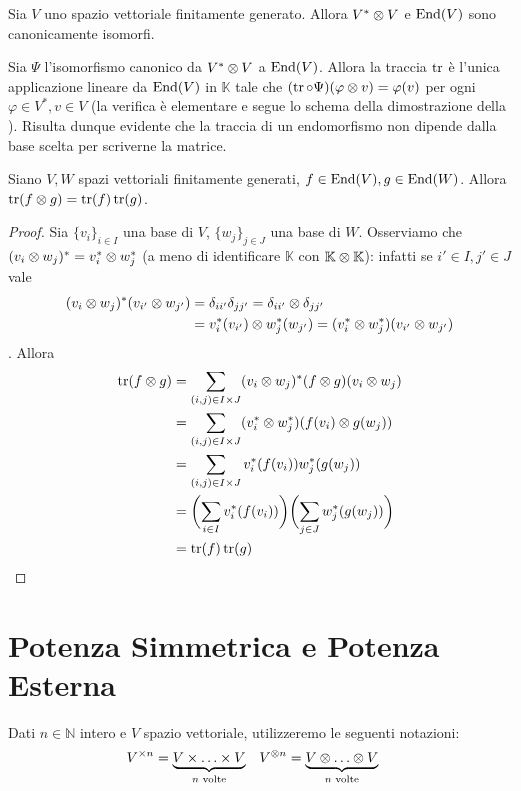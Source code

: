 \begin{corollary}
Sia $V$ uno spazio vettoriale finitamente generato. Allora $V^*\otimes V$ e $\operatorname{End}(V)$ sono canonicamente isomorfi.
\end{corollary}

\begin{example}
Sia $\Psi$ l'isomorfismo canonico da $V^*\otimes V$ a $\operatorname{End}(V)$. Allora la traccia $\operatorname{tr}$ è l'unica applicazione lineare da $\operatorname{End}(V)$ in $\mathbb{K}$ tale che $(\operatorname{tr}\circ\Psi)(\varphi\otimes v)=\varphi(v)$ per ogni $\varphi\in V^*,v\in V$ (la verifica è elementare e segue lo schema della dimostrazione della ). Risulta dunque evidente che la traccia di un endomorfismo non dipende dalla base scelta per scriverne la matrice.
\end{example}

\begin{proposition}
Siano $V\comma W$ spazi vettoriali finitamente generati, $f\in\operatorname{End}(V),\allowbreak g\in\operatorname{End}(W)$. Allora $\operatorname{tr}(f\otimes g)=\operatorname{tr}(f)\operatorname{tr}(g)$.
\end{proposition}
\begin{proof}
Sia $\{v_i\}_{i\in I}$ una base di $V$, $\{w_j\}_{j\in J}$ una base di $W$. Osserviamo che $(v_i\otimes w_j)^*=v_i^*\otimes w_j^*$ (a meno di identificare $\mathbb{K}$ con $\mathbb{K}\otimes\mathbb{K}$): infatti se $i'\in I\comma j'\in J$ vale 
\begin{align*}
(v_i\otimes w_j)^*(v_{i'}\otimes w_{j'})&=\delta_{ii'}\delta_{jj'}=\delta_{ii'}\otimes\delta_{jj'}\\&=v_i^*(v_{i'})\otimes w_j^*(w_{j'})=(v_i^*\otimes w_j^*)(v_{i'}\otimes w_{j'})
\end{align*}
. Allora
\begin{align*}
\operatorname{tr}(f\otimes g)&=\sum_{(i,j)\in I\times J}(v_i\otimes w_j)^*(f\otimes g)(v_i\otimes w_j)\\
&=\sum_{(i,j)\in I\times J}(v_i^*\otimes w_j^*)(f(v_i)\otimes g(w_j))\\
&=\sum_{(i,j)\in I\times J}v_i^*(f(v_i))w_j^*(g(w_j))\\
&=\biggl(\sum_{i\in I}v_i^*(f(v_i))\biggr)\biggl(\sum_{j\in J}w_j^*(g(w_j))\biggr)\\
&=\operatorname{tr}(f)\operatorname{tr}(g)
\end{align*}
\end{proof}

\section{Potenza Simmetrica e Potenza Esterna}
Dati $n\in\mathbb{N}$ intero e $V$ spazio vettoriale, utilizzeremo le seguenti notazioni:
\begin{align*}
V^{\times n}&=\underbrace{V\times\ldots\times V}_{\text{$n$ volte}}&V^{\otimes n}&=\underbrace{V\otimes\ldots\otimes V}_{\text{$n$ volte}}
\end{align*}

